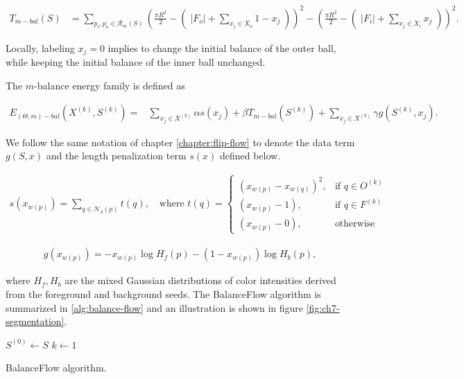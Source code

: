 \begin{align}
	T_{m-bal}(S) &= \sum_{p_i,p_o \in \mathcal{R}_m(S)}{( \frac{\pi R^2}{2} - (\; |F_o| + \sum_{ x_j \in X_o}{1-x_j} \; ) )^2 -(\frac{\pi R^2}{2} - (\; |F_i| + \sum_{x_j \in X_i}{x_j}\;))^2}.
	\label{eq:balance-term}
\end{align}

Locally, labeling $x_j=0$ implies to change the initial balance of the outer ball, while keeping the initial balance of the inner ball unchanged. 

The $m$-balance energy family is defined as

\begin{align}
  E_{(\Theta,m)-bal}(X^{(k)},S^{(k)}) =& \sum_{x_j \in X^{(k)}}{\alpha s(x_j)} + \beta T_{m-bal}(S^{(k)}) + \sum_{x_j \in X^{(k)}}{\gamma g(S^{(k)},x_j)}.
  \label{eq:single-step-energy-family}
\end{align}

We follow the same notation of chapter \ref{chapter:flip-flow} to denote the data term $g(S,x)$ and the length penalization term $s(x)$ defined below. 

\begin{align}
  s(x_{w(p)})=\sum_{q \in \mathcal{N}_4(p)}{ t(q) }, \quad \text{where } t(q) = \left\{\begin{array}{ll}
  (x_{w(p)}-x_{w(q)})^2, & \text{if } q \in O^{(k)}\\
  (x_{w(p)}-1), & \text{if } q \in F^{(k)}\\
  (x_{w(p)}-0), & \text{otherwise }
  \end{array}\right.
  \label{eq:single-step-length-penalization}
\end{align}

\begin{align}
  g(x_{w(p)}) = -x_{w(p)}\log{H_f(p)} - (1-x_{w(p)})\log{H_b(p)},
  \label{eq:single-step-data-fidelity}
\end{align}	

where $H_f ,H_b $ are the mixed Gaussian distributions of color intensities derived from the foreground and background seeds. The BalanceFlow algorithm is summarized in \ref{alg:balance-flow} and an illustration is shown in figure \ref{fig:ch7-segmentation}.

\begin{algorithm}
 
 \BlankLine
 $S^{(0)} \longleftarrow S$\;
 $k \longleftarrow 1$\;
 \caption{BalanceFlow algorithm.}
 \label{alg:balance-flow}  
\end{algorithm}

